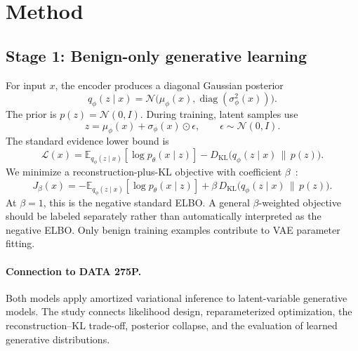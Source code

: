 \documentclass{article}
\newcommand{\E}{\mathbb{E}}
\newcommand{\KL}{D_{\mathrm{KL}}}
\begin{document}
\section{Method}

\subsection{Stage 1: Benign-only generative learning}
For input $x$, the encoder produces a diagonal Gaussian posterior
\begin{equation}
q_\phi(z\mid x)=\mathcal{N}\!\bigl(\mu_\phi(x),\operatorname{diag}(\sigma_\phi^2(x))\bigr).
\end{equation}
The prior is $p(z)=\mathcal{N}(0,I)$.
During training, latent samples use
\begin{equation}
z=\mu_\phi(x)+\sigma_\phi(x)\odot\epsilon,
\qquad \epsilon\sim\mathcal{N}(0,I).
\end{equation}
The standard evidence lower bound is
\begin{equation}
\mathcal{L}(x)
=
\E_{q_\phi(z\mid x)}[\log p_\theta(x\mid z)]
-
\KL\!\bigl(q_\phi(z\mid x)\,\|\,p(z)\bigr).
\end{equation}
We minimize a reconstruction-plus-KL objective with coefficient $\beta$~\citep{higgins}:
\begin{equation}
J_\beta(x)
=
-\E_{q_\phi(z\mid x)}[\log p_\theta(x\mid z)]
+
\beta\,\KL\!\bigl(q_\phi(z\mid x)\,\|\,p(z)\bigr).
\end{equation}
At $\beta=1$, this is the negative standard ELBO.
A general $\beta$-weighted objective should be labeled separately rather than automatically interpreted as the negative ELBO.
Only benign training examples contribute to VAE parameter fitting.

\paragraph{Connection to DATA 275P.}
Both models apply amortized variational inference to latent-variable generative models.
The study connects likelihood design, reparameterized optimization, the reconstruction--KL trade-off, posterior collapse, and the evaluation of learned generative distributions.
\end{document}
